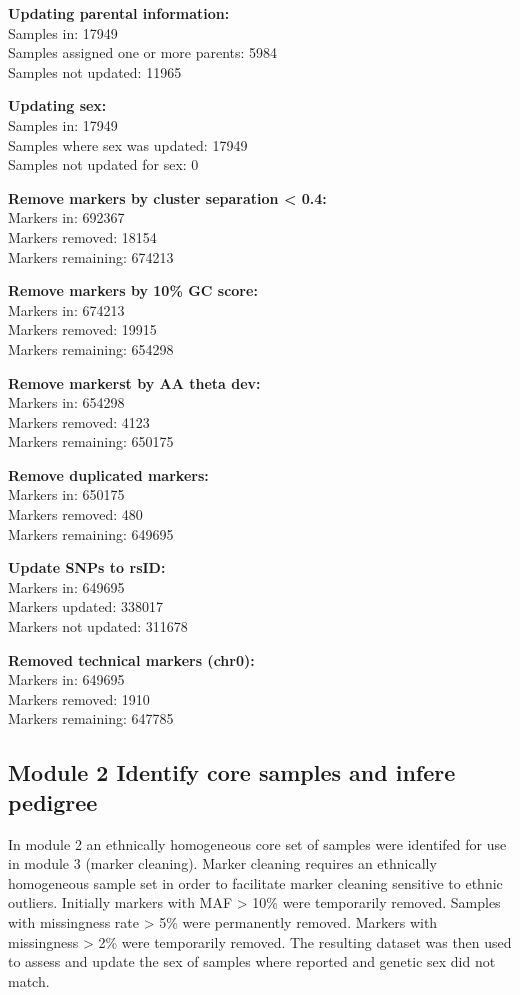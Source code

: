 \documentclass[]{article}
\begin{document}
\textbf{Updating parental information:}\\
Samples in: 17949\\
Samples assigned one or more parents: 5984\\
Samples not updated: 11965

\textbf{Updating sex:}\\
Samples in: 17949\\
Samples where sex was updated: 17949\\
Samples not updated for sex: 0

\textbf{Remove markers by cluster separation \textless{} 0.4:}\\
Markers in: 692367\\
Markers removed: 18154\\
Markers remaining: 674213

\textbf{Remove markers by 10\% GC score:}\\
Markers in: 674213\\
Markers removed: 19915\\
Markers remaining: 654298

\textbf{Remove markerst by AA theta dev:}\\
Markers in: 654298\\
Markers removed: 4123\\
Markers remaining: 650175

\textbf{Remove duplicated markers:}\\
Markers in: 650175\\
Markers removed: 480\\
Markers remaining: 649695

\textbf{Update SNPs to rsID:}\\
Markers in: 649695\\
Markers updated: 338017\\
Markers not updated: 311678

\textbf{Removed technical markers (chr0):}\\
Markers in: 649695\\
Markers removed: 1910\\
Markers remaining: 647785

\subsection{Module 2 Identify core samples and infere
pedigree}\label{module-2-identify-core-samples-and-infere-pedigree}

In module 2 an ethnically homogeneous core set of samples were identifed
for use in module 3 (marker cleaning). Marker cleaning requires an
ethnically homogeneous sample set in order to facilitate marker cleaning
sensitive to ethnic outliers. Initially markers with MAF \textgreater{}
10\% were temporarily removed. Samples with missingness rate
\textgreater{} 5\% were permanently removed. Markers with missingness
\textgreater{} 2\% were temporarily removed. The resulting dataset was
then used to assess and update the sex of samples where reported and
genetic sex did not match.
\end{document}

